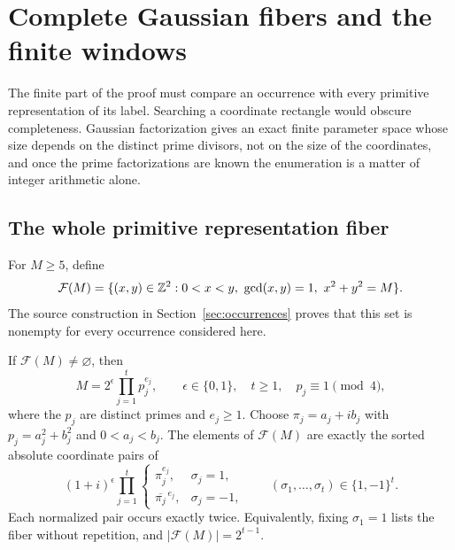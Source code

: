 \section{Complete Gaussian fibers and the finite windows}
\label{sec:gaussian}

The finite part of the proof must compare an occurrence with every
primitive representation of its label. Searching a coordinate rectangle
would obscure completeness. Gaussian factorization gives an exact finite
parameter space whose size depends on the distinct prime divisors, not
on the size of the coordinates, and once the prime factorizations are
known the enumeration is a matter of integer arithmetic alone.

\subsection{The whole primitive representation fiber}

For $M\geqslant5$, define
$$
 \mathcal F(M)=\{(x,y)\in\mathbb{Z}^2:0<x<y,\ \gcd(x,y)=1,\ x^2+y^2=M\}.
$$
The source construction in Section~\ref{sec:occurrences} proves that this
set is nonempty for every occurrence considered here.

\begin{proposition}
\label{prop:gaussian-fibre}
If $\mathcal F(M)\ne\varnothing$, then
\begin{equation}\label{eq:gaussian-factorization}
 M=2^\epsilon\prod_{j=1}^t p_j^{e_j},\qquad
 \epsilon\in\{0,1\},\quad t\geqslant1,\quad
 p_j\equiv1\pmod4,
\end{equation}
where the $p_j$ are distinct primes and $e_j\geqslant1$.
Choose $\pi_j=a_j+ib_j$ with $p_j=a_j^2+b_j^2$ and $0<a_j<b_j$.
The elements of $\mathcal F(M)$ are exactly the sorted absolute
coordinate pairs of
\begin{equation}\label{eq:gaussian-sign-cube}
 (1+i)^\epsilon\prod_{j=1}^t
 \begin{cases}
 \pi_j^{e_j},&\sigma_j=1,\\
 \overline{\pi_j}^{\,e_j},&\sigma_j=-1,
 \end{cases}
 \qquad (\sigma_1,\ldots,\sigma_t)\in\{1,-1\}^t.
\end{equation}
Each normalized pair occurs exactly twice. Equivalently, fixing
$\sigma_1=1$ lists the fiber without repetition, and
$|\mathcal F(M)|=2^{t-1}$.
\end{proposition}

